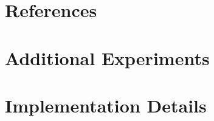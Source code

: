 \documentclass{article}
\begin{document}
\section*{References}


\appendix
\section{Additional Experiments}


\section{Implementation Details}


\end{document}
